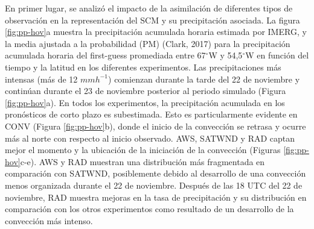 \documentclass[12pt,oneside,a4paper]{reedthesis}
\begin{document}
En primer lugar, se analizó el impacto de la asimilación de diferentes tipos de observación en la representación del SCM y su precipitación asociada. La figura \ref{fig:pp-hov}a muestra la precipitación acumulada horaria estimada por IMERG, y la media ajustada a la probabilidad (PM) (Clark, 2017) para la precipitación acumulada horaria del first-guess promediada entre 67\(^{\circ}\)W y 54,5\(^{\circ}\)W en función del tiempo y la latitud en los diferentes experimentos. Las precipitaciones más intensas (más de 12 \(mmh^{-1}\)) comienzan durante la tarde del 22 de noviembre y continúan durante el 23 de noviembre posterior al periodo simulado (Figura \ref{fig:pp-hov}a). En todos los experimentos, la precipitación acumulada en los pronósticos de corto plazo es subestimada. Esto es particularmente evidente en CONV (Figura \ref{fig:pp-hov}b), donde el inicio de la convección se retrasa y ocurre más al norte con respecto al inicio observado. AWS, SATWND y RAD captan mejor el momento y la ubicación de la iniciación de la convección (Figuras \ref{fig:pp-hov}c-e). AWS y RAD muestran una distribución más fragmentada en comparación con SATWND, posiblemente debido al desarrollo de una convección menos organizada durante el 22 de noviembre. Después de las 18 UTC del 22 de noviembre, RAD muestra mejoras en la tasa de precipitación y su distribución en comparación con los otros experimentos como resultado de un desarrollo de la convección más intenso.
\end{document}
